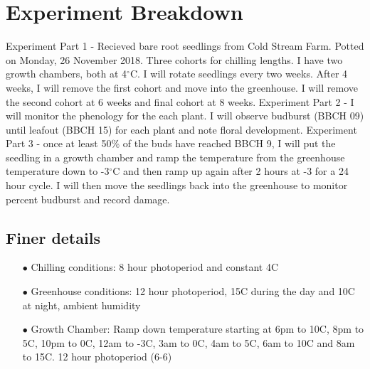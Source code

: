 \documentclass{article}\usepackage[]{graphicx}\usepackage[]{color}
\begin{document}
\renewcommand{\thetable}{\arabic{table}}
\renewcommand{\thefigure}{\arabic{figure}}
\renewcommand{\labelitemi}{$-$}

\renewcommand{\thesection}{\arabic{section}.}
\renewcommand\thesubsection{\arabic{section}.\arabic{subsection}} 

\section*{Experiment Breakdown}

Experiment Part 1 - Recieved bare root seedlings from Cold Stream Farm. Potted on Monday, 26 November 2018. Three cohorts for chilling lengths. I have two growth chambers, both at 4$^{\circ}$C. I will rotate seedlings every two weeks. After 4 weeks, I will remove the first cohort and move into the greenhouse. I will remove the second cohort at 6 weeks and final cohort at 8 weeks. Experiment Part 2 - I will monitor the phenology for the each plant. I will observe budburst (BBCH 09) until leafout (BBCH 15) for each plant and note floral development. Experiment Part 3 - once at least 50\% of the buds have reached BBCH 9, I will put the seedling in a growth chamber and ramp the temperature from the greenhouse temperature down to  -3$^{\circ}$C and then ramp up again after 2 hours at -3 for a 24 hour cycle. I will then move the seedlings back into the greenhouse to monitor percent budburst and record damage.

\subsection*{Finer details}
\begin{itemize}
\item[$\bullet$] Chilling conditions: 8 hour photoperiod and constant 4C
\item[$\bullet$] Greenhouse conditions: 12 hour photoperiod, 15C during the day and 10C at night, ambient humidity
\item[$\bullet$] Growth Chamber: Ramp down temperature starting at 6pm to 10C, 8pm to 5C, 10pm to 0C, 12am to -3C, 3am to 0C, 4am to 5C, 6am to 10C and 8am to 15C. 12 hour photoperiod (6-6) 
\end{itemize}
\end{document}
